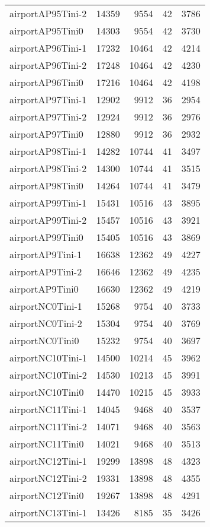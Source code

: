 \begin{longtable}{lrrrr}
airportAP95Tini-2 & 14359 & 9554 & 42 & 3786 \\
airportAP95Tini0 & 14303 & 9554 & 42 & 3730 \\
airportAP96Tini-1 & 17232 & 10464 & 42 & 4214 \\
airportAP96Tini-2 & 17248 & 10464 & 42 & 4230 \\
airportAP96Tini0 & 17216 & 10464 & 42 & 4198 \\
airportAP97Tini-1 & 12902 & 9912 & 36 & 2954 \\
airportAP97Tini-2 & 12924 & 9912 & 36 & 2976 \\
airportAP97Tini0 & 12880 & 9912 & 36 & 2932 \\
airportAP98Tini-1 & 14282 & 10744 & 41 & 3497 \\
airportAP98Tini-2 & 14300 & 10744 & 41 & 3515 \\
airportAP98Tini0 & 14264 & 10744 & 41 & 3479 \\
airportAP99Tini-1 & 15431 & 10516 & 43 & 3895 \\
airportAP99Tini-2 & 15457 & 10516 & 43 & 3921 \\
airportAP99Tini0 & 15405 & 10516 & 43 & 3869 \\
airportAP9Tini-1 & 16638 & 12362 & 49 & 4227 \\
airportAP9Tini-2 & 16646 & 12362 & 49 & 4235 \\
airportAP9Tini0 & 16630 & 12362 & 49 & 4219 \\
airportNC0Tini-1 & 15268 & 9754 & 40 & 3733 \\
airportNC0Tini-2 & 15304 & 9754 & 40 & 3769 \\
airportNC0Tini0 & 15232 & 9754 & 40 & 3697 \\
airportNC10Tini-1 & 14500 & 10214 & 45 & 3962 \\
airportNC10Tini-2 & 14530 & 10213 & 45 & 3991 \\
airportNC10Tini0 & 14470 & 10215 & 45 & 3933 \\
airportNC11Tini-1 & 14045 & 9468 & 40 & 3537 \\
airportNC11Tini-2 & 14071 & 9468 & 40 & 3563 \\
airportNC11Tini0 & 14021 & 9468 & 40 & 3513 \\
airportNC12Tini-1 & 19299 & 13898 & 48 & 4323 \\
airportNC12Tini-2 & 19331 & 13898 & 48 & 4355 \\
airportNC12Tini0 & 19267 & 13898 & 48 & 4291 \\
airportNC13Tini-1 & 13426 & 8185 & 35 & 3426 \\

\end{longtable}
